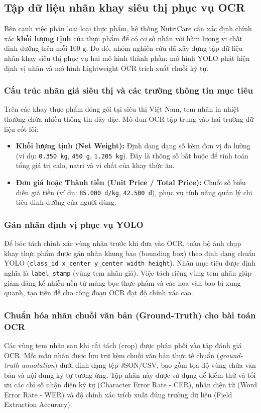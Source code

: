 \subsection{Tập dữ liệu nhãn khay siêu thị phục vụ OCR}

Bên cạnh việc phân loại loại thực phẩm, hệ thống NutriCare cần xác định chính xác \textbf{khối lượng tịnh} của thực phẩm để có cơ sở nhân với hàm lượng vi chất dinh dưỡng trên mỗi $100\text{ g}$. Do đó, nhóm nghiên cứu đã xây dựng tập dữ liệu nhãn khay siêu thị phục vụ hai mô hình thành phần: mô hình YOLO phát hiện định vị nhãn và mô hình Lightweight OCR trích xuất chuỗi ký tự.

\subsubsection{Cấu trúc nhãn giá siêu thị và các trường thông tin mục tiêu}
Trên các khay thực phẩm đóng gói tại siêu thị Việt Nam, tem nhãn in nhiệt thường chứa nhiều thông tin dày đặc. Mô-đun OCR tập trung vào hai trường dữ liệu cốt lõi:
\begin{itemize}[leftmargin=0.8cm, label=\textbullet, itemsep=2pt, topsep=2pt]
    \item \textbf{Khối lượng tịnh (Net Weight):} Định dạng dạng số kèm đơn vị đo lường (ví dụ: \texttt{0.350 kg}, \texttt{450 g}, \texttt{1.205 kg}). Đây là thông số bắt buộc để tính toán tổng giá trị calo, natri và vi chất của khay thức ăn.
    \item \textbf{Đơn giá hoặc Thành tiền (Unit Price / Total Price):} Chuỗi số biểu diễn giá tiền (ví dụ: \texttt{85.000 đ/kg}, \texttt{42.500 đ}), phục vụ tính năng quản lý chi tiêu dinh dưỡng của người dùng.
\end{itemize}

\subsubsection{Gán nhãn định vị phục vụ YOLO}
Để bóc tách chính xác vùng nhãn trước khi đưa vào OCR, toàn bộ ảnh chụp khay thực phẩm được gán nhãn khung bao (bounding box) theo định dạng chuẩn YOLO (\texttt{class\_id x\_center y\_center width height}). Nhãn mục tiêu được định nghĩa là \texttt{label\_stamp} (vùng tem nhãn giá). Việc tách riêng vùng tem nhãn giúp giảm đáng kể nhiễu nền từ màng bọc thực phẩm và các hoa văn bao bì xung quanh, tạo tiền đề cho công đoạn OCR đạt độ chính xác cao.

\subsubsection{Chuẩn hóa nhãn chuỗi văn bản (Ground-Truth) cho bài toán OCR}
Các vùng tem nhãn sau khi cắt tách (crop) được phân phối vào tập đánh giá OCR. Mỗi mẫu nhãn được lưu trữ kèm chuỗi văn bản thực tế chuẩn (\textit{ground-truth annotation}) dưới định dạng tệp JSON/CSV, bao gồm tọa độ vùng chứa văn bản và nội dung ký tự tương ứng. Tập nhãn này được sử dụng để kiểm thử và tối ưu các chỉ số nhận diện ký tự (Character Error Rate - CER), nhận diện từ (Word Error Rate - WER) và độ chính xác trích xuất đúng trường dữ liệu (Field Extraction Accuracy).
